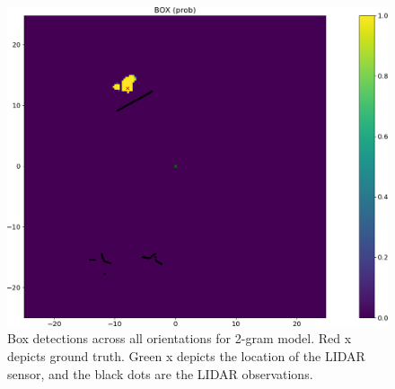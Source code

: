 %
\begin{figure}
  \centering
  \includegraphics[width=\columnwidth]{figures/box_2gram.png}
  \caption{Box detections across all orientations for 2-gram model. Red x
    depicts ground truth. Green x depicts the location of the LIDAR sensor, and
    the black dots are the LIDAR observations.}
  \label{fig:box_2gram}
\end{figure}
